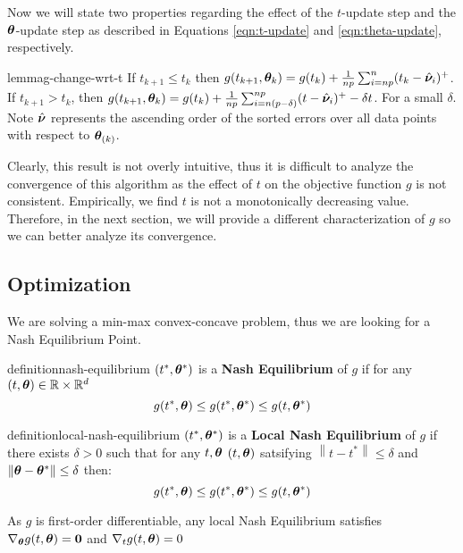 \documentclass{article} %
\newcommand{\norm}[1]{\left\lVert#1\right\rVert}
\begin{document}
	Now we will state two properties regarding the effect of the $t$-update step and the ${\bm{\theta}}$-update step as described in Equations \ref{eqn:t-update} and \ref{eqn:theta-update}, respectively. 
	\begin{restatable}{lemma}{g-change-wrt-t}
		\label{lem:g-change-wrt-t}
		If $t_{k+1} \leq t_k$ then $ g(t_{k+1},{\bm{\theta}}_k) = g(t_{k}) + \frac{1}{np}\sum_{i=np}^n(t_k - \hat{{\bm{\nu}}}_i)^+$. If $t_{k+1} > t_k$, then $ g(t_{k+1},{\bm{\theta}}_k) = g(t_k) + \frac{1}{np}\sum_{i=n(p-\delta)}^{np}(t-\hat{{\bm{\nu}}}_i)^+  - \delta t$. For a small $\delta$. Note $\hat{{\bm{\nu}}}$ represents the ascending order of the sorted errors over all data points with respect to ${\bm{\theta}}_{(k)}$. 
	\end{restatable}
	Clearly, this result is not overly intuitive, thus it is difficult to analyze the convergence of this algorithm as the effect of $t$ on the objective function $g$ is not consistent. Empirically, we find $t$ is not a monotonically decreasing value. Therefore, in the next section, we will provide a different characterization of $g$ so we can better analyze its convergence. 

	\subsection{Optimization}

	We are solving a min-max convex-concave problem, thus we are looking for a Nash Equilibrium Point. 
	
	\begin{restatable}{definition}{nash-equilibrium}
		\label{def:nash-equilibrium}
		$(t^*,{\bm{\theta}}^*)$ is a \textbf{Nash Equilibrium} of $g$ if for any $(t,{\bm{\theta}}) \in \mathbb{R}\times\mathbb{R}^d$\vspace{1em}
		\begin{equation}
			g(t^*,{\bm{\theta}}) \leq g(t^*,{\bm{\theta}}^*) \leq g(t,{\bm{\theta}}^*)
		\end{equation}
	\end{restatable}	
	\begin{restatable}{definition}{local-nash-equilibrium}
		\label{def:local-nash-equilibrium}
		$(t^*,{\bm{\theta}}^*)$ is a \textbf{Local Nash Equilibrium} of $g$ if there exists $\delta > 0$ such that for any $t,{\bm{\theta}}$ $(t,{\bm{\theta}})$ satsifying $\norm{t - t^*} \leq \delta$ and $\norm{\vtheta -\vtheta^*} \leq \delta$ then: 
		\vspace{1em}
		\begin{equation}
			g(t^*,{\bm{\theta}}) \leq g(t^*,{\bm{\theta}}^*) \leq g(t,{\bm{\theta}}^*)
		\end{equation}
	\end{restatable}
	\begin{proposition}\label{prop:first-order-nash}
		As $g$ is first-order differentiable,  any local Nash Equilibrium satisfies $\nabla_{\bm{\theta}} g(t,{\bm{\theta}}) = \mathbf{0}$ and $\nabla_t g(t,{\bm{\theta}}) = 0$
	\end{proposition}
	
\end{document}
